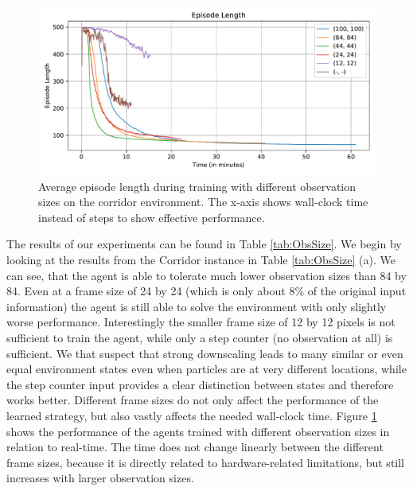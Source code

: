\begin{figure}[htp]
    \begin{center}
        \includegraphics[clip, width=0.95\columnwidth]{figures/evaluation/observations/maze0318_ep_len_time.pdf}
    \end{center}
    \caption[Episode Length on the Corridor Environment using Different Observation Sizes]{Average episode length during training with different observation sizes on the corridor environment. The x-axis shows wall-clock time instead of steps to show effective performance.} \label{fig:ObsSize/Maze0318/EpLen}
\end{figure}


The results of our experiments can be found in Table \ref{tab:ObsSize}. We begin by looking at the results from the Corridor instance in Table \ref{tab:ObsSize} (a). We can see, that the agent is able to tolerate much lower observation sizes than 84 by 84. Even at a frame size of 24 by 24 (which is only about 8\% of the original input information) the agent is still able to solve the environment with only slightly worse performance. Interestingly the smaller frame size of 12 by 12 pixels is not sufficient to train the agent, while only a step counter (no observation at all) is sufficient. We that suspect that strong downscaling leads to many similar or even equal environment states even when particles are at very different locations, while the step counter input provides a clear distinction between states and therefore works better. Different frame sizes do not only affect the performance of the learned strategy, but also vastly affects the needed wall-clock time. Figure \ref{fig:ObsSize/Maze0318/EpLen} shows the performance of the agents trained with different observation sizes in relation to real-time. The time does not change linearly between the different frame sizes, because it is directly related to hardware-related limitations, but still increases with larger observation sizes.





